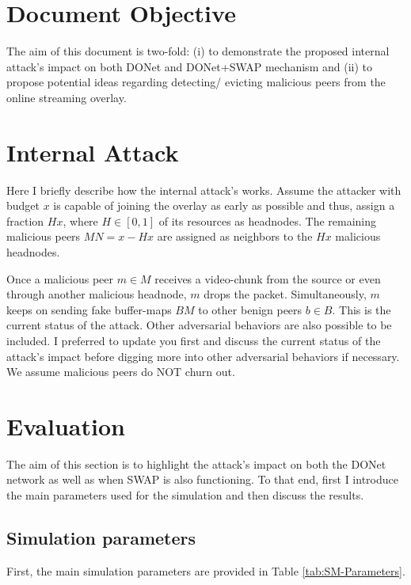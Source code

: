 \section{Document Objective}
The aim of this document is two-fold: (i) to demonstrate the proposed internal attack’s impact on both DONet and DONet+SWAP mechanism and (ii) to propose potential ideas regarding detecting/ evicting malicious peers from the online streaming overlay.

\section{Internal Attack}
Here I briefly describe how the internal attack's works.
Assume the attacker with budget $x$  is capable of joining the overlay as early as possible and thus, assign a fraction $Hx$, where $H\in [0,1]$ of its resources as headnodes.
The remaining malicious peers $MN=x-Hx$ are assigned as neighbors to the $Hx$ malicious headnodes. 

Once a malicious peer $m\in M$ receives a video-chunk from the source or even through another malicious headnode, $m$ drops the packet. Simultaneously, $m$ keeps on sending fake buffer-maps $BM$ to other benign peers $b \in B$. 
This is the current status of the attack. Other adversarial behaviors are also possible to be included. I preferred to update you first and discuss the current status of the attack's impact before digging more into other adversarial behaviors if necessary.
We assume malicious peers do NOT churn out.	

\section{Evaluation}
The aim of this section is to highlight the attack's impact on both the DONet network as well as when SWAP is also functioning. To that end, first I introduce the main parameters used for the simulation and then discuss the results.

\subsection{Simulation parameters}
First, the main simulation parameters are provided in Table \ref{tab:SM-Parameters}.

